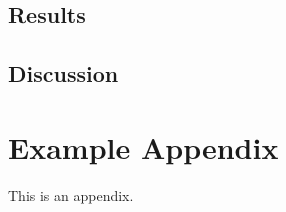 \documentclass[11pt]{article}
\begin{document}
\subsection{Results}

\subsection{Discussion}






\appendix

\section{Example Appendix}
\label{sec:appendix}

This is an appendix.
\end{document}
